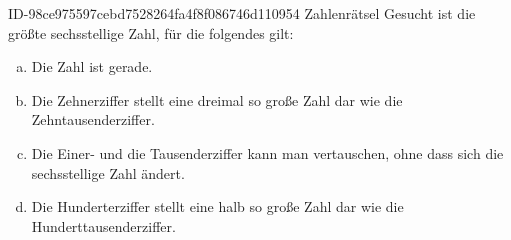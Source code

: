\begin{exercise}
      {ID-98ce975597cebd7528264fa4f8f086746d110954}
      {Zahlenrätsel}
  \ifproblem\problem
    Gesucht ist die größte sechsstellige Zahl, für die folgendes gilt:
    \begin{enumerate}[a)]
      \squeeze
      \item Die Zahl ist gerade.
      \item Die Zehnerziffer stellt eine dreimal so große Zahl dar wie
            die Zehntausenderziffer.
      \item Die Einer- und die Tausenderziffer kann man vertauschen,
            ohne dass sich die sechsstellige Zahl ändert.
      \item Die Hunderterziffer stellt eine halb so große Zahl dar wie
            die Hunderttausenderziffer.
    \end{enumerate}
  \fi
\end{exercise}
